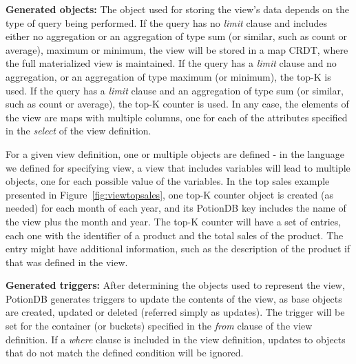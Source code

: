 \documentclass[sigplan,review,anonymous]{acmart}
\begin{document}
\noindent
\textbf{Generated objects:}
The object used for storing the view's data depends on the type of query being performed. 
If the query has no  \emph{limit} clause and includes either no aggregation or an aggregation of type sum (or similar, such as count or average), maximum or minimum, the view will be stored in a map CRDT, where the full materialized view is maintained. 
If the query has a  \emph{limit} clause and no aggregation, or an aggregation of type maximum (or minimum), the top-K is used.
If the query has a \emph{limit} clause and an aggregation of type sum (or similar, such as count or average), the top-K counter is used.
In any case, the elements of the view are maps with multiple columns, one for each
of the attributes specified in the  \emph{select} of the view definition.  

For a given view definition, one or multiple objects are defined - in the language we defined for 
specifying view,  a view that includes variables will lead to multiple objects,
one for each possible value of the variables. 
In the top sales example presented in Figure~\ref{fig:viewtopsales}, one top-K counter
object is created (as needed) for each month of each year, and its PotionDB key includes
the name of the view plus the month and year.  The top-K counter will have a set
of entries, each one with the identifier of a product and the total sales of the product. The entry
might have additional information, such as the description of the product if that was defined
in the view.

\noindent
\textbf{Generated triggers:}
After determining the objects used to represent the view, PotionDB generates triggers to update 
the contents of the view, as base objects are created, updated or deleted (referred simply as updates). 
The trigger will be set for the container (or buckets) specified in the \emph{from} clause of the view
definition.
If a \emph{where} clause is included in the view definition, updates to objects that do not match the 
defined condition will be ignored.
\end{document}
